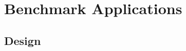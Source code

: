 \documentclass{beamer}
\begin{document}










\section{Benchmark Applications}

\subsection{Design}
\end{document}
